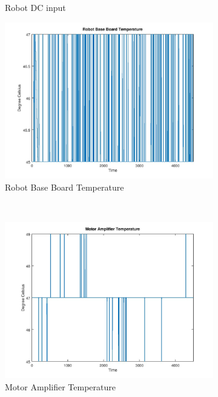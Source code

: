 \begin{figure}[ht]
\begin{subfigure}{.5\textwidth}
 \caption{Robot DC input}
 \label{fig:Robot DC input}
\end{subfigure}
\begin{subfigure}{.5\textwidth}
 \centering
 \includegraphics[width=.9\linewidth]{Figures/Robot_Base_Board_Temperature}
 \caption{Robot Base Board Temperature}
 \label{fig:Robot Base Board Temperature}
\end{subfigure}\\
\begin{subfigure}{.5\textwidth}
 \centering
 \includegraphics[width=.9\linewidth]{Figures/Motor_Amplifier_Temperature}
 \caption{Motor Amplifier Temperature}
 \label{fig:Motor Amplifier Temperature}
\end{subfigure}
\begin{subfigure}{.5\textwidth}
 \centering

\end{subfigure}
\end{figure}
